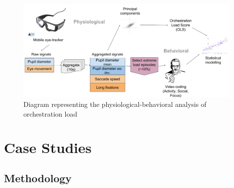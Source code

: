\documentclass[10pt,journal,compsoc]{IEEEtran}
\begin{document}


\begin{figure}[!t]
\centering
\includegraphics[width=\linewidth]{img/AnalysisMethodBase.png}
\caption{Diagram representing the physiological-behavioral analysis of orchestration load}
\label{fig:analysis}
\end{figure}

\section{Case Studies}

\subsection{Methodology}
\end{document}
